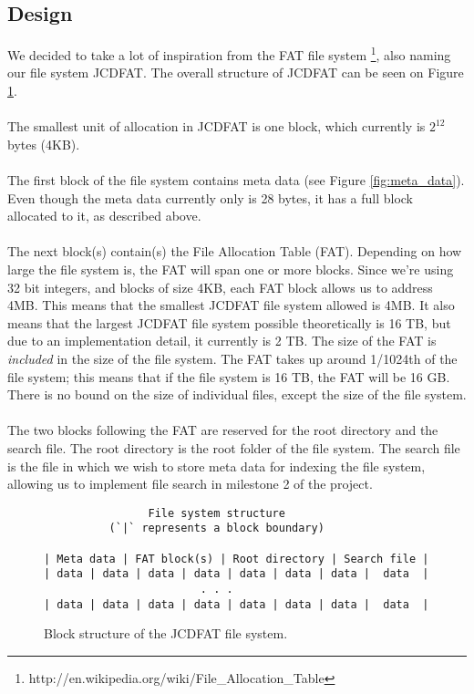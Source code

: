 \documentclass[11pt]{article}
\begin{document}
\subsection{Design}
We decided to take a lot of inspiration from the FAT file system
\footnote{http://en.wikipedia.org/wiki/File\_Allocation\_Table}, also naming our file system JCDFAT. The overall structure of JCDFAT can be seen on Figure \ref{fig:block_structure}.\\
\\
The smallest unit of allocation in JCDFAT is one block, which currently is $2^{12}$ bytes (4KB).\\
\\
The first block of the file system contains meta data (see Figure \ref{fig:meta_data}). Even though the meta data currently only is 28 bytes, it has a full block allocated to it, as described above.\\
\\
The next block(s) contain(s) the File Allocation Table (FAT). Depending on how large the file system is, the FAT will span one or more blocks.
Since we're using 32 bit integers, and blocks of size 4KB, each FAT block allows us to address 4MB. This means that the smallest JCDFAT file system allowed is 4MB. It also means that the largest JCDFAT file system possible theoretically is 16 TB, but due to an implementation detail, it currently is 2 TB. The size of the FAT is \emph{included} in the size of the file system. The FAT takes up around 1/1024th of the file system; this means that if the file system is 16 TB, the FAT will be 16 GB.\\
There is no bound on the size of individual files, except the size of the file system.\\
\\
The two blocks following the FAT are reserved for the root directory and the search file. The root directory is the root folder of the file system. The search file is the file in which we wish to store meta data for indexing the file system, allowing us to implement file search in milestone 2 of the project.
\begin{figure}[ht]
    \begin{verbatim}
                File system structure
          (`|` represents a block boundary)

| Meta data | FAT block(s) | Root directory | Search file |
| data | data | data | data | data | data | data |  data  |
                        . . .
| data | data | data | data | data | data | data |  data  |
    \end{verbatim}
    \caption{Block structure of the JCDFAT file system.}
    \label{fig:block_structure}
\end{figure}
\end{document}
